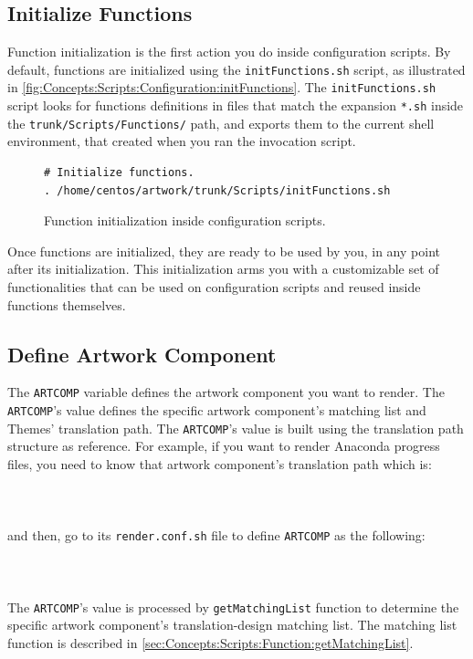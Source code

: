 \subsection{Initialize Functions}

Function initialization is the first action you do inside
configuration scripts.  By default, functions are initialized using
the \texttt{initFunctions.sh} script, as illustrated in
\autoref{fig:Concepts:Scripts:Configuration:initFunctions}.  The
\texttt{initFunctions.sh} script looks for functions definitions in
files that match the expansion \texttt{*.sh} inside the
\texttt{trunk/Scripts/Functions/} path, and exports them to the
current shell environment, that created when you ran the invocation
script.

\begin{figure}[!hbp]
\hrulefill
\begin{verbatim}
# Initialize functions.
. /home/centos/artwork/trunk/Scripts/initFunctions.sh
\end{verbatim}
\hrulefill
\caption{Function initialization inside configuration scripts.%
   \label{fig:Concepts:Scripts:Configuration:initFunctions}}
\end{figure}

Once functions are initialized, they are ready to be used by you, in
any point after its initialization.  This initialization arms you with
a customizable set of functionalities that can be used on
configuration scripts and reused inside functions themselves.

\subsection{Define Artwork Component}

The \texttt{ARTCOMP} variable defines the artwork component you want
to render.  The \texttt{ARTCOMP}'s value defines the specific artwork
component's matching list and Themes' translation path.  The
\texttt{ARTCOMP}'s value is built using the translation path structure
as reference.  For example, if you want to render Anaconda progress
files, you need to know that artwork component's translation path
which is:\\
\\
\\
\\
and then, go to its \texttt{render.conf.sh} file to define
\texttt{ARTCOMP} as the following:\\
\\
\\
\\
The \texttt{ARTCOMP}'s value is processed by \texttt{getMatchingList}
function to determine the specific artwork component's
translation-design matching list. The matching list function is
described in \autoref{sec:Concepts:Scripts:Function:getMatchingList}.

